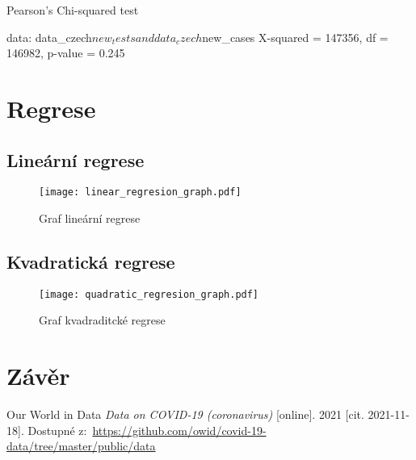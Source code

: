 \documentclass[a4paper, 12pt]{article}
\begin{document}
\begin{Schunk}
\begin{Soutput}
	Pearson's Chi-squared test

data:  data_czech$new_tests and data_czech$new_cases
X-squared = 147356, df = 146982, p-value = 0.245
\end{Soutput}
\end{Schunk}

\section{Regrese}
\subsection{Lineární regrese}
\begin{figure}[H]
\centering
\texttt{[image: linear\_regresion\_graph.pdf]}
\caption{Graf lineární regrese}

\end{figure}

\subsection{Kvadratická regrese}
\begin{figure}[H]
\centering
\texttt{[image: quadratic\_regresion\_graph.pdf]}
\caption{Graf kvadraditcké regrese}

\end{figure}

\clearpage


\clearpage {} {}
\section*{Závěr}


\clearpage {} {}

\begin{thebibliography}{99}	%


Our World in Data
\textit{Data on COVID-19 (coronavirus)} [online]. 2021 [cit. 2021-11-18]. Dostupné z:~\url{https://github.com/owid/covid-19-data/tree/master/public/data}

\end{thebibliography}
\end{document}

